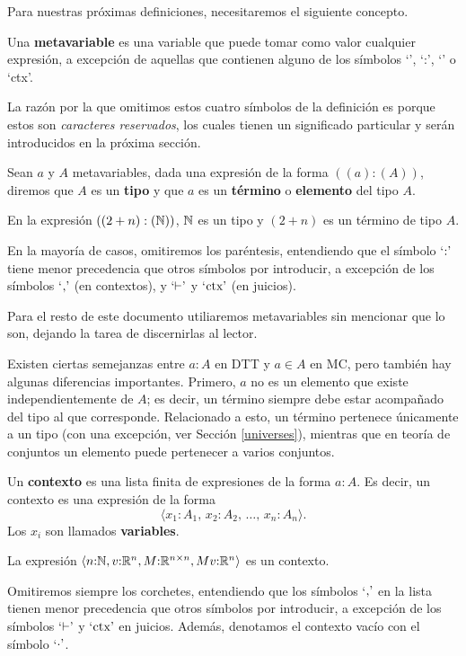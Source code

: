 \documentclass[../main.tex]{subfiles}
\begin{document}
Para nuestras pr\'oximas definiciones, necesitaremos el siguiente concepto.

\begin{definition}
    Una \textbf{metavariable} es una variable que puede tomar como valor cualquier expresi\'on, a excepción de aquellas que contienen alguno de los s\'imbolos `\equiv', `:', `\vdash' o `ctx'.
\end{definition}

La raz\'on por la que omitimos estos cuatro s\'imbolos de la definici\'on es porque estos son \textit{caracteres reservados}, los cuales tienen un significado particular y ser\'an introducidos en la pr\'oxima secci\'on.

\begin{definition}
    Sean $a$ y $A$ metavariables, dada una expresión de la forma
    $((a):(A))$, diremos que $A$ es un \textbf{tipo} y que $a$ es un \textbf{término} o \textbf{elemento} del tipo $A$.
\end{definition}
\begin{example}
    En la expresión $((2+n):(\mathbb{N}))$, $\mathbb{N}$ es un tipo y $(2+n)$ es un término de tipo $A$.
\end{example}
\begin{notation}
    En la mayoría de casos, omitiremos los paréntesis, entendiendo que el símbolo `${:}\textrm'$ tiene menor precedencia que otros símbolos por introducir, a excepción de los símbolos `${,}\textrm'$ (en contextos), y `${\vdash}\textrm'$ y  `${\textnormal{ctx}}\textrm'$ (en juicios).
\end{notation}

Para el resto de este documento utiliaremos metavariables sin mencionar que lo son, dejando la tarea de discernirlas al lector.

Existen ciertas semejanzas entre $a:A$ en DTT y $a \in A$ en MC, pero también hay algunas diferencias importantes.
Primero, $a$ no es un elemento que existe independientemente de $A$; es decir, un término siempre debe estar acompañado del tipo al que corresponde.
Relacionado a esto, un término pertenece únicamente a un tipo (con una excepción, ver Sección \ref{universes}), mientras que en teoría de conjuntos un elemento puede pertenecer a varios conjuntos.

\begin{definition}
    Un \textbf{contexto} es una lista finita de expresiones de la forma $a:A$. Es decir, un contexto es una expresión de la forma
    $$\langle x_1{:}A_1, \, x_2{:}A_2, \, \dots, \, x_n{:}A_n\rangle.$$
    Los $x_i$ son llamados \textbf{variables}.
\end{definition}
\begin{example}
    La expresión $\langle n{:}\mathbb{N},v{:}\mathbb{R}^n,M{:}\mathbb{R}^{n\times n}, Mv{:}\mathbb{R}^n \rangle$ es un contexto.
\end{example}
\begin{notation}
    Omitiremos siempre los corchetes, entendiendo que los símbolos `${,}\textrm'$ en la lista tienen menor precedencia que otros símbolos por introducir, a excepción de los símbolos `${\vdash}\textrm'$ y  `${\textnormal{ctx}}\textrm'$ en juicios. Además, denotamos el contexto vac\'io con el símbolo `${\cdot}\textrm'$.
\end{notation}
\end{document}
